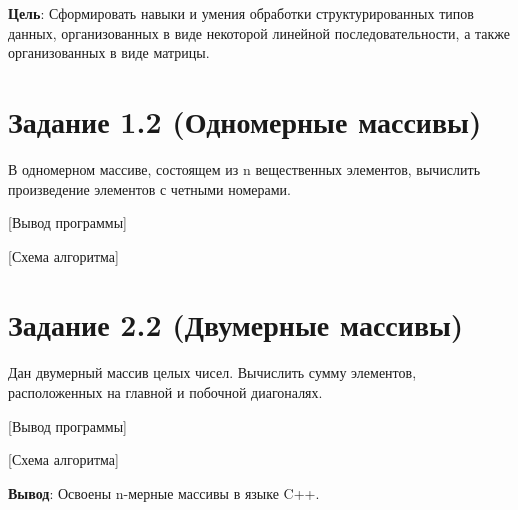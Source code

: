 \documentclass{bsuir}
\begin{document}

\textbf{Цель}: Сформировать навыки и умения обработки структурированных типов
данных, организованных в виде некоторой линейной последовательности, а также
организованных в виде матрицы.

\section*{Задание 1.2 (Одномерные массивы)}

В одномерном массиве, состоящем из n вещественных элементов, вычислить
произведение элементов с четными номерами.


[Вывод программы]

[Схема алгоритма]

\section*{Задание 2.2 (Двумерные массивы)}

Дан двумерный массив целых чисел. Вычислить сумму элементов, расположенных на
главной и побочной диагоналях.


[Вывод программы]

[Схема алгоритма]

\textbf{Вывод}: Освоены n-мерные массивы в языке C++.
\end{document}
